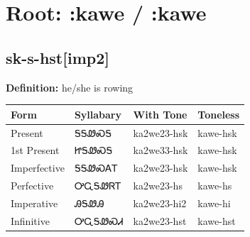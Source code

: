 \documentclass{article}%
\begin{document}
%
\normalsize%
\section*{Root: :kawe / :kawe}%
\subsection*{sk-s-hst[imp2]}%
\textbf{Definition: }%
he/she is rowing%
\\[0.5em]%
\begin{tabular}{|l|l|l|l|}%
\hline%
\textbf{Form}&\textbf{Syllabary}&\textbf{With Tone}&\textbf{Toneless}\\%
\hline%
Present&ᎦᎦᏪᏍᎦ&ka2we23{-}hsk&kawe{-}hsk\\%
1st Present&ᏥᎦᏪᏍᎦ&ka2we33{-}hsk&kawe{-}hsk\\%
Imperfective&ᎦᎦᏪᏍᎪᎢ&ka2we23{-}hsk&kawe{-}hsk\\%
Perfective&ᎤᏩᎦᏪᏒᎢ&ka2we23{-}hs&kawe{-}hs\\%
Imperative&ᎯᎦᏪᎯ&ka2we23{-}hi2&kawe{-}hi\\%
Infinitive&ᎤᏩᎦᏪᏍᏗ&ka2we23{-}hst&kawe{-}hst\\%
\hline%
\end{tabular}%
\\[1em]%
\end{document}
